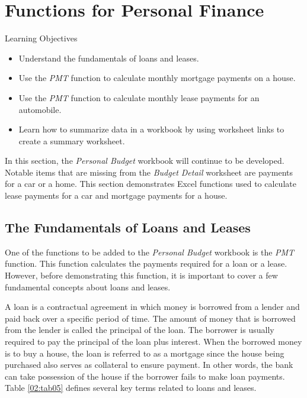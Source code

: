 \section{Functions for Personal Finance}\label{ch02:functions_personal}

\begin{center}
	\begin{objbox}{Learning Objectives}
		\begin{itemize}
			\setlength{\itemsep}{0pt}
			\setlength{\parskip}{0pt}
			\setlength{\parsep}{0pt}
			
			\item Understand the fundamentals of loans and leases.
			\item Use the \textit{PMT} function to calculate monthly mortgage payments on a house.
			\item Use the \textit{PMT} function to calculate monthly lease payments for an automobile.
			\item Learn how to summarize data in a workbook by using worksheet links to create a summary worksheet.

		\end{itemize}
	\end{objbox}
\end{center}

In this section, the \textit{Personal Budget} workbook will continue to be developed. Notable items that are missing from the \textit{Budget Detail} worksheet are payments for a car or a home. This section demonstrates Excel functions used to calculate lease payments for a car and mortgage payments for a house.

\subsection{The Fundamentals of Loans and Leases}

One of the functions to be added to the \textit{Personal Budget} workbook is the \textit{PMT} function. This function calculates the payments required for a loan or a lease. However, before demonstrating this function, it is important to cover a few fundamental concepts about loans and leases.

A loan is a contractual agreement in which money is borrowed from a lender and paid back over a specific period of time. The amount of money that is borrowed from the lender is called the principal of the loan. The borrower is usually required to pay the principal of the loan plus interest. When the borrowed money is to buy a house, the loan is referred to as a mortgage since the house being purchased also serves as collateral to ensure payment. In other words, the bank can take possession of the house if the borrower fails to make loan payments. Table \ref{02:tab05} defines several key terms related to loans and leases.

